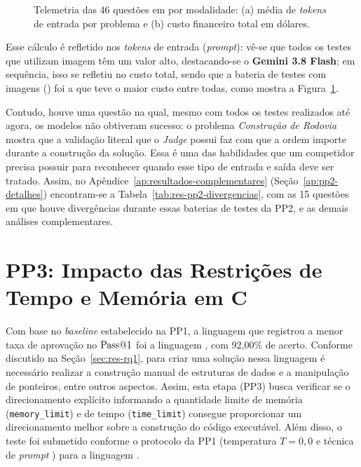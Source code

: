\begin{figure}[!htbp]
\centering

\caption[Tokens de entrada e custo total por modalidade na PP2]{Telemetria das $46$ questões em  por modalidade: (a) média de \textit{tokens} de entrada por problema e (b) custo financeiro total em dólares.}
\label{fig:res-pp2-tokens-custo}
\end{figure}
\FloatBarrier

Esse cálculo é refletido nos \textit{tokens} de entrada (\textit{prompt}): vê-se que todos os testes que utilizam imagem têm um valor alto, destacando-se o \textbf{Gemini 3.8 Flash}; em sequência, isso se refletiu no custo total, sendo que a bateria de testes com imagens () foi a que teve o maior custo entre todas, como mostra a Figura~\ref{fig:res-pp2-tokens-custo}.

Contudo, houve uma questão na qual, mesmo com todos os testes realizados até agora, os modelos não obtiveram sucesso: o problema \textit{Construção de Rodovia} mostra que a validação literal que o \textit{Judge} possui faz com que a ordem importe durante a construção da solução. Essa é uma das habilidades que um competidor precisa possuir para reconhecer quando esse tipo de entrada e saída deve ser tratado. Assim, no Apêndice~\ref{ap:resultados-complementares} (Seção~\ref{ap:pp2-detalhes}) encontram-se a Tabela~\ref{tab:res-pp2-divergencias}, com as 15 questões em que houve divergências durante essas baterias de testes da PP2, e as demais análises complementares.

\section{PP3: Impacto das Restrições de Tempo e Memória em C}\label{sec:res-rq3}

Com base no \textit{baseline} estabelecido na PP1, a linguagem que registrou a menor taxa de aprovação no $\mathrm{Pass@}1$ foi a linguagem , com 92,00\% de acerto. Conforme discutido na Seção~\ref{sec:res-rq1}, para criar uma solução nessa linguagem é necessário realizar a construção manual de estruturas de dados e a manipulação de ponteiros, entre outros aspectos. Assim, esta etapa (PP3) busca verificar se o direcionamento explícito informando a quantidade limite de memória (\texttt{memory\_limit}) e de tempo (\texttt{time\_limit}) consegue proporcionar um direcionamento melhor sobre a construção do código executável. Além disso, o teste foi submetido conforme o protocolo da PP1 (temperatura $T = 0{,}0$ e técnica de \textit{prompt} ) para a linguagem .

